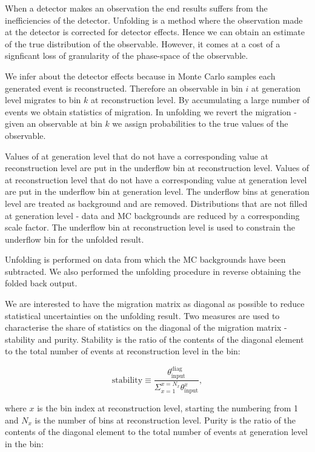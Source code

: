 When a detector makes an observation the end results suffers from the inefficiencies of the detector. Unfolding is a method where the observation made at the detector is corrected for detector effects. Hence we can obtain an estimate of the true distribution of the observable. However, it comes at a cost of a signficant loss of granularity of the phase-space of the observable.

We infer about the detector effects because in Monte Carlo samples each generated event is reconstructed. Therefore an observable in bin $i$ at generation level migrates to bin $k$ at reconstruction level. By accumulating a large number of events we obtain statistics of migration. In unfolding we revert the migration - given an observable at bin $k$ we assign probabilities to the true values of the observable.

Values of \pullangle at generation level that do not have a corresponding value at reconstruction level are put in the underflow bin at reconstruction level. Values of \pullangle at reconstruction level that do not have a corresponding value at generation level are put in the underflow bin at generation level. The underflow bins at generation level are treated as background and are removed. Distributions that are not filled at generation level - data and MC backgrounds are reduced by a corresponding scale factor. The underflow bin at reconstruction level is used to constrain the underflow bin for the unfolded result.

Unfolding is performed on data from which the MC backgrounds have been subtracted. We also performed the unfolding procedure in reverse obtaining the folded back output.

We are interested to have the migration matrix as diagonal as possible to reduce statistical uncertainties on the unfolding result. Two measures are used to characterise the share of statistics on the diagonal of the migration matrix - stability and purity. Stability is the ratio of the contents of the diagonal element to the total number of events at reconstruction level in the bin:

\begin{equation}
  \text{stability}\equiv\frac{\theta^{\text{diag}}_{\text{input}}}{\Sigma_{x=1}^{x=N_{x}}\theta^{x}_{\text{input}}},
\end{equation}

where $x$ is the bin index at reconstruction level, starting the numbering from 1 and $N_{x}$ is the number of bins at reconstruction level. Purity is the ratio of the contents of the diagonal element to the total number of events at generation level in the bin:

